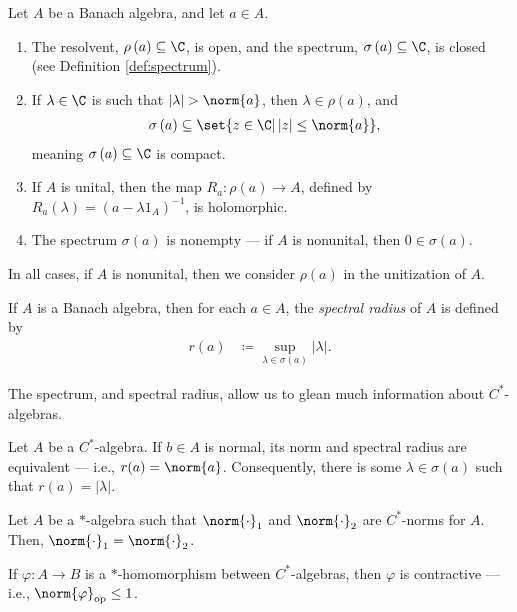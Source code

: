 \begin{theorem}\label{thm:spectrum_of_cstar_algebras}
  Let $A$ be a Banach algebra, and let $a\in A$.
  \begin{enumerate}[(1)]
    \item The resolvent, $\rho\left( a \right)\subseteq \C$, is open, and the spectrum, $\sigma\left( a \right)\subseteq \C$, is closed (see Definition \ref{def:spectrum}).
    \item If $\lambda\in\C$ is such that $\left\vert \lambda \right\vert > \norm{a}$, then $\lambda\in \rho(a)$, and 
      \begin{align*}
        \sigma\left( a \right) &\subseteq \set{z\in\C | \left\vert z \right\vert\leq \norm{a}},
      \end{align*}
      meaning $\sigma\left( a \right)\subseteq \C$ is compact.
    \item If $A$ is unital, then the map $R_a\colon \rho\left( a \right)\rightarrow A$, defined by $R_a\left( \lambda \right) = \left( a - \lambda 1_A \right)^{-1}$, is holomorphic.
    \item The spectrum $\sigma\left( a \right)$ is nonempty --- if $A$ is nonunital, then $0\in \sigma\left( a \right)$.
  \end{enumerate}
\end{theorem}
\begin{remark}
  In all cases, if $A$ is nonunital, then we consider $\rho\left( a \right)$ in the unitization of $A$.
\end{remark}
\begin{definition}{\cite[Definition 7.3.5]{rainone_analysis}}
  If $A$ is a Banach algebra, then for each $a\in A$, the \textit{spectral radius} of $A$ is defined by
  \begin{align*}
    r(a) &\coloneq \sup_{\lambda\in \sigma\left( a \right)}\left\vert \lambda \right\vert.
  \end{align*}
\end{definition}
The spectrum, and spectral radius, allow us to glean much information about $C^{\ast}$-algebras.
\begin{proposition}
  Let $A$ be a $C^{\ast}$-algebra. If $b\in A$ is normal, its norm and spectral radius are equivalent --- i.e., $r(a) =\norm{a} $. Consequently, there is some $\lambda\in \sigma\left( a \right)$ such that $r(a) = \left\vert \lambda \right\vert$.
\end{proposition}
\begin{proposition}
  Let $A$ be a ${\ast}$-algebra such that $\norm{\cdot}_1$ and $\norm{\cdot}_2$ are $C^{\ast}$-norms for $A$. Then, $\norm{\cdot}_1 = \norm{\cdot}_2$.
\end{proposition}
\begin{proposition}
  If $\varphi\colon A\rightarrow B$ is a $\ast$-homomorphism between $C^{\ast}$-algebras, then $\varphi$ is contractive --- i.e., $\norm{\varphi}_{\op}\leq 1$.
\end{proposition}
